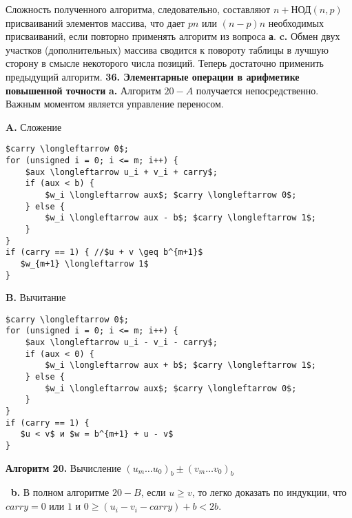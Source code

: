 \newpage
Сложность полученного алгоритма, следовательно, составляют $n + \text{НОД}(n,p)$ присваиваний элементов массива, что дает $pn$ или $(n - p)n$ необходимых присваиваний, если повторно применять алгоритм из во­проса \textbf{а}.
\newline \newline \indent
\textbf{c.} Обмен двух участков (дополнительных) массива сводится к по­вороту таблицы в лучшую сторону в смысле некоторого числа позиций. Теперь достаточно применить предыдущий алгоритм.
\newline \newline
\textbf{36. Элементарные операции в арифметике повышенной точности}
\newline \newline \indent
\textbf{a.} Алгоритм $20-A$ получается непосредственно. Важным моментом
является управление переносом.
\begin{multicols}{2}
\begin{center}
\textbf{A.} Сложение
\end{center}
{\begin{lstlisting}[mathescape=true]
$carry \longleftarrow 0$;
for (unsigned i = 0; i <= m; i++) {
    $aux \longleftarrow u_i + v_i + carry$;
    if (aux < b) {
        $w_i \longleftarrow aux$; $carry \longleftarrow 0$;   
    } else {
        $w_i \longleftarrow aux - b$; $carry \longleftarrow 1$;
    }
}
if (carry == 1) { //$u + v \geq b^{m+1}$
   $w_{m+1} \longleftarrow 1$
}
\end{lstlisting}}
\columnbreak
\begin{center}
\textbf{B.} Вычитание
\end{center}
{\begin{lstlisting}[mathescape=true]
$carry \longleftarrow 0$;
for (unsigned i = 0; i <= m; i++) {
    $aux \longleftarrow u_i - v_i - carry$;
    if (aux < 0) {
        $w_i \longleftarrow aux + b$; $carry \longleftarrow 1$;   
    } else {
        $w_i \longleftarrow aux$; $carry \longleftarrow 0$;
    }
}
if (carry == 1) {
   $u < v$ и $w = b^{m+1} + u - v$
}
\end{lstlisting}}
\end{multicols}
\begin{center}
\textbf{Алгоритм 20.} Вычисление $(u_m \dots u_0)_b \pm (v_m \dots v_0)_b$
\end{center}
$\:$ \newline
\textit{\indent}\textbf{b.} В полном алгоритме $20-B$, если $u \geq v$, то легко доказать по ин­дукции, что $carry = 0$ или $1$ и $0 \geq (u_i - v_i - carry) + b < 2b$.
